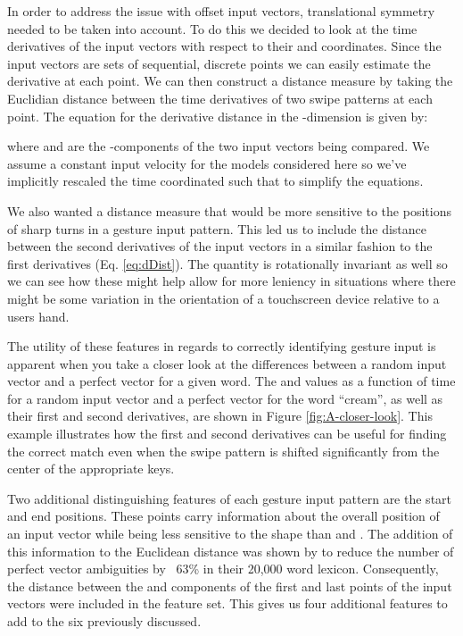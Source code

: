 \documentclass[final,1p,times,authoryear]{elsarticle}
\begin{document}
In order to address the issue with offset input vectors, translational
symmetry needed to be taken into account. To do this we decided to
look at the time derivatives of the input vectors with respect to
their  and  coordinates. Since the input vectors are sets
of sequential, discrete points we can easily estimate the derivative
at each point. We can then construct a distance measure by taking
the Euclidian distance between the time derivatives of two swipe patterns
at each point. The equation for the derivative distance in the -dimension
is given by:


where  and  are the -components of the two input
vectors being compared. We assume a constant input velocity for the
models considered here so we've implicitly rescaled the time coordinated
such that  to simplify the equations.

We also wanted a distance measure that would be more sensitive to
the positions of sharp turns in a gesture input pattern. This led us to include
the distance between the second derivatives of the input vectors
in a similar fashion to the first derivatives (Eq. \ref{eq:dDist}).
The quantity  is rotationally
invariant as well so we can see how these might help allow for more
leniency in situations where there might be some variation in the
orientation of a touchscreen device relative to a users hand.

The utility of these features in regards to correctly identifying
gesture input is apparent when you take a closer look at the differences
between a random input vector and a perfect vector for a given word.
The  and  values as a function of time for a random input
vector and a perfect vector for the word ``cream'', as well as their
first and second derivatives, are shown in Figure \ref{fig:A-closer-look}.
This example illustrates how the first and second derivatives can
be useful for finding the correct match even when the swipe pattern
is shifted significantly from the center of the appropriate keys.

Two additional distinguishing features of each gesture input pattern are the
start and end positions. These points carry information about the
overall position of an input vector while being less sensitive to
the shape than  and . The addition of this information to the Euclidean distance was
shown by \cite{SHARK2} to reduce the number of perfect vector ambiguities by ~63\% 
in their 20,000 word lexicon. Consequently, the distance
between the  and  components of the first and last points
of the input vectors were included in the feature set. This gives us four additional
features to add to the six previously discussed.
\end{document}
